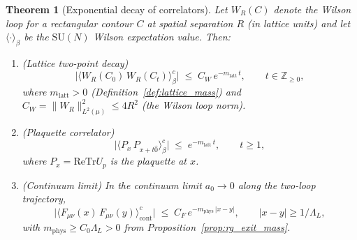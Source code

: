 \documentclass[11pt,a4paper]{amsart}
\newtheorem{theorem}{Theorem}[section]
\theoremstyle{definition}
\newcommand{\SU}{\mathrm{SU}}
\newcommand{\Z}{\mathbb{Z}}
\newcommand{\re}{\mathrm{Re}}
\newcommand{\Tr}{\mathrm{Tr}}
\begin{document}
\begin{theorem}[Exponential decay of correlators]
\label{thm:exp_decay}
Let $W_R(C)$ denote the Wilson loop for a rectangular contour $C$ at spatial
separation $R$ (in lattice units) and let $\langle\cdot\rangle_\beta$ be the
$\SU(N)$ Wilson expectation value.  Then:
\begin{enumerate}[label=(\roman*)]
\item \emph{(Lattice two-point decay)}
  \[
    \bigl|\langle W_R(C_0)\,W_R(C_t)\rangle_\beta^c\bigr|
    \;\le\; C_W\,e^{-m_{\mathrm{latt}}\,t},
    \qquad t \in \Z_{\ge 0},
  \]
  where $m_{\mathrm{latt}} > 0$ (Definition~\ref{def:lattice_mass})
  and $C_W = \|W_R\|_{L^2(\mu)}^2 \le 4R^2$ (the Wilson loop norm).
\item \emph{(Plaquette correlator)}
  \[
    \bigl|\langle P_x\,P_{x+t\hat{0}}\rangle_\beta^c\bigr|
    \;\le\; e^{-m_{\mathrm{latt}}\,t},
    \qquad t \ge 1,
  \]
  where $P_x = \re\Tr U_p$ is the plaquette at $x$.
\item \emph{(Continuum limit)}
  In the continuum limit $a_0\to 0$ along the two-loop trajectory,
  \[
    \bigl|\langle F_{\mu\nu}(x)\,F_{\mu\nu}(y)\rangle_{\mathrm{cont}}^c\bigr|
    \;\le\; C_F\,e^{-m_{\mathrm{phys}}\,|x-y|},
    \qquad |x-y| \ge 1/\Lambda_L,
  \]
  with $m_{\mathrm{phys}} \ge C_0\Lambda_L > 0$ from
  Proposition~\ref{prop:rg_exit_mass}.
\end{enumerate}
\end{theorem}
\end{document}
